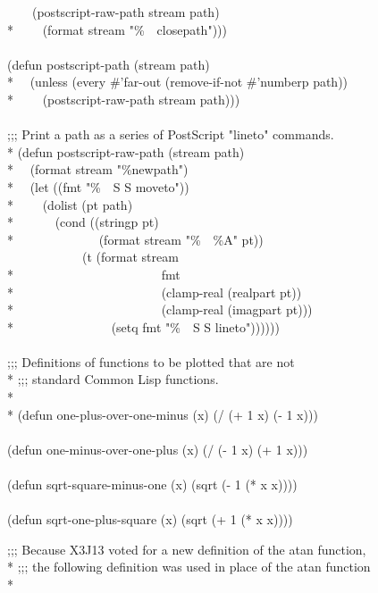 \begin{new}
\begin{lisp}
~~~~(postscript-raw-path stream path) \\*
~~~~(format stream "{\Xtilde}\%~~closepath"))) \\
\\
(defun postscript-path (stream path) \\*
~~(unless (every \#'far-out (remove-if-not \#'numberp path)) \\*
~~~~(postscript-raw-path stream path))) \\
\\
;;; Print a path as a series of PostScript "lineto" commands. \\*
(defun postscript-raw-path (stream path) \\*
~~(format stream "{\Xtilde}\%newpath") \\*
~~(let ((fmt "{\Xtilde}\%~~{\Xtilde}S {\Xtilde}S moveto")) \\*
~~~~(dolist (pt path) \\*
~~~~~~(cond ((stringp pt) \\*
~~~~~~~~~~~~~(format stream "{\Xtilde}\%~~\%{\Xtilde}A" pt)) \\
~~~~~~~~~~~~(t (format stream \\*
~~~~~~~~~~~~~~~~~~~~~~~fmt \\*
~~~~~~~~~~~~~~~~~~~~~~~(clamp-real (realpart pt)) \\*
~~~~~~~~~~~~~~~~~~~~~~~(clamp-real (imagpart pt))) \\*
~~~~~~~~~~~~~~~(setq fmt "{\Xtilde}\%~~{\Xtilde}S {\Xtilde}S lineto")))))) \\
\\
;;; Definitions of functions to be plotted that are not \\*
;;; standard Common Lisp functions. \\*
\\*
(defun one-plus-over-one-minus (x) (/ (+ 1 x) (- 1 x))) \\
\\
(defun one-minus-over-one-plus (x) (/ (- 1 x) (+ 1 x))) \\
\\
(defun sqrt-square-minus-one (x) (sqrt (- 1 (* x x)))) \\
\\
(defun sqrt-one-plus-square (x) (sqrt (+ 1 (* x x))))
\end{lisp}
 \newpage%
\begin{lisp}
;;; Because X3J13 voted for a new definition of the atan function, \\*
;;; the following definition was used in place of the atan function \\*

\end{lisp}
\end{new}

